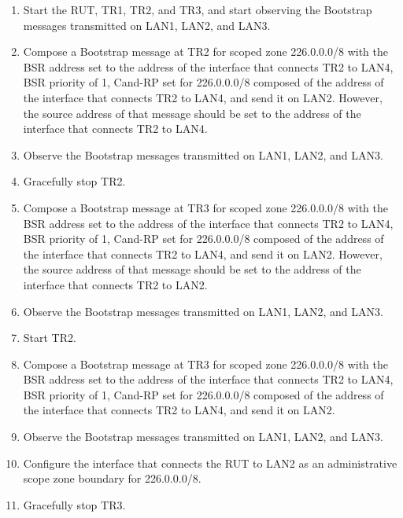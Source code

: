 \documentclass[11pt]{report}
\begin{document}
\begin{enumerate}

  \item Start the RUT, TR1, TR2, and TR3, and start observing the Bootstrap
  messages transmitted on LAN1, LAN2, and LAN3.

  \item Compose a Bootstrap message at TR2 for scoped zone 226.0.0.0/8 with
  the BSR address set to the address of the interface that connects TR2 to
  LAN4, BSR priority of 1, Cand-RP set for 226.0.0.0/8 composed of the
  address of the interface that connects TR2 to LAN4, and send it on LAN2.
  However, the source address of that message should be set to the address
  of the interface that connects TR2 to LAN4.

  \item Observe the Bootstrap messages transmitted on LAN1, LAN2, and LAN3.

  \item Gracefully stop TR2.

  \item Compose a Bootstrap message at TR3 for scoped zone 226.0.0.0/8 with
  the BSR address set to the address of the interface that connects TR2 to
  LAN4, BSR priority of 1, Cand-RP set for 226.0.0.0/8 composed of the
  address of the interface that connects TR2 to LAN4, and send it on LAN2.
  However, the source address of that message should be set to the address
  of the interface that connects TR2 to LAN2.

  \item Observe the Bootstrap messages transmitted on LAN1, LAN2, and LAN3.

  \item Start TR2.

  \item Compose a Bootstrap message at TR3 for scoped zone 226.0.0.0/8 with
  the BSR address set to the address of the interface that connects TR2 to
  LAN4, BSR priority of 1, Cand-RP set for 226.0.0.0/8 composed of the
  address of the interface that connects TR2 to LAN4, and send it on LAN2.

  \item Observe the Bootstrap messages transmitted on LAN1, LAN2, and LAN3.

  \item Configure the interface that connects the RUT to LAN2 as an
  administrative scope zone boundary for 226.0.0.0/8.

  \item Gracefully stop TR3.


\end{enumerate}
\end{document}
